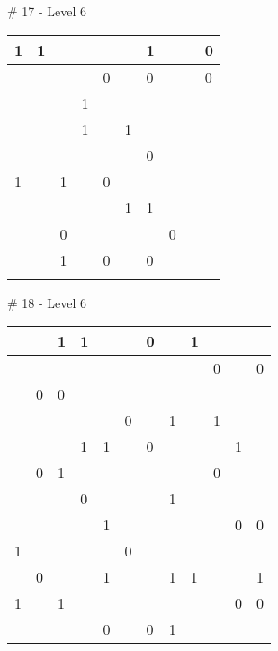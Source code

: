 \medskip

\# 17 - Level 6 \newline
\begin{tabular}{|m{\collen}|m{\collen}|m{\collen}|m{\collen}|m{\collen}|m{\collen}|m{\collen}|m{\collen}|m{\collen}|m{\collen}|}
\hline
  1 & 1 &   &   &   &   & 1 &   &   & 0 \\
\hline
    &   &   &   & 0 &   & 0 &   &   & 0 \\
\hline
    &   &   & 1 &   &   &   &   &   &   \\
\hline
    &   &   & 1 &   & 1 &   &   &   &   \\
\hline
    &   &   &   &   &   & 0 &   &   &   \\
\hline
  1 &   & 1 &   & 0 &   &   &   &   &   \\
\hline
    &   &   &   &   & 1 & 1 &   &   &   \\
\hline
    &   & 0 &   &   &   &   & 0 &   &   \\
\hline
    &   & 1 &   & 0 &   & 0 &   &   &   \\
\hline
    &   &   &   &   &   &   &   &   &   \\
\hline
\end{tabular}


\medskip

\# 18 - Level 6 \newline
\begin{tabular}{|m{\collen}|m{\collen}|m{\collen}|m{\collen}|m{\collen}|m{\collen}|m{\collen}|m{\collen}|m{\collen}|m{\collen}|m{\collen}|m{\collen}|}
\hline
    &   & 1 & 1 &   &   & 0 &   & 1 &   &   &   \\
\hline
    &   &   &   &   &   &   &   &   & 0 &   & 0 \\
\hline
    & 0 & 0 &   &   &   &   &   &   &   &   &   \\
\hline
    &   &   &   &   & 0 &   & 1 &   & 1 &   &   \\
\hline
    &   &   & 1 & 1 &   & 0 &   &   &   & 1 &   \\
\hline
    & 0 & 1 &   &   &   &   &   &   & 0 &   &   \\
\hline
    &   &   & 0 &   &   &   & 1 &   &   &   &   \\
\hline
    &   &   &   & 1 &   &   &   &   &   & 0 & 0 \\
\hline
  1 &   &   &   &   & 0 &   &   &   &   &   &   \\
\hline
    & 0 &   &   & 1 &   &   & 1 & 1 &   &   & 1 \\
\hline
  1 &   & 1 &   &   &   &   &   &   &   & 0 & 0 \\
\hline
    &   &   &   & 0 &   & 0 & 1 &   &   &   &   \\
\hline
\end{tabular}


